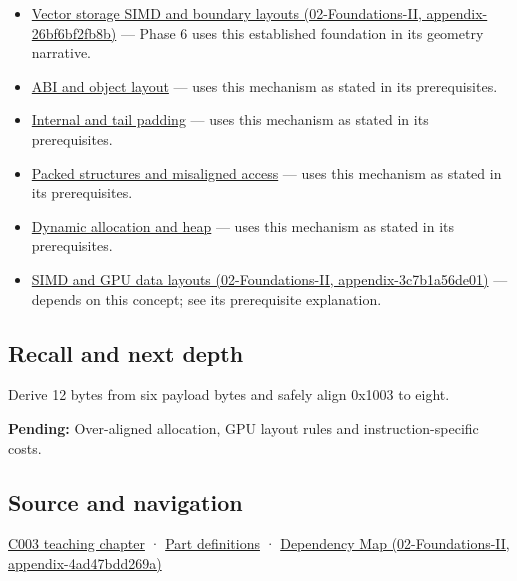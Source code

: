 \begin{itemize}
\item
  \href{../02-Foundations-II/main.pdf\#nameddest=appendix-26bf6bf2fb8b}{Vector storage SIMD and boundary layouts (02-Foundations-II, appendix-26bf6bf2fb8b)} --- Phase 6 uses this established foundation in its geometry narrative.
\item
  \hyperref[appendix-c4ac6bb0fff8]{ABI and object layout} --- uses this mechanism as stated in its prerequisites.
\item
  \hyperref[appendix-f52f8c5a3afd]{Internal and tail padding} --- uses this mechanism as stated in its prerequisites.
\item
  \hyperref[appendix-0682dbfc5f0e]{Packed structures and misaligned access} --- uses this mechanism as stated in its prerequisites.
\item
  \hyperref[appendix-c3480f7d9ff3]{Dynamic allocation and heap} --- uses this mechanism as stated in its prerequisites.
\item
  \href{../02-Foundations-II/main.pdf\#nameddest=appendix-3c7b1a56de01}{SIMD and GPU data layouts (02-Foundations-II, appendix-3c7b1a56de01)} --- depends on this concept; see its prerequisite explanation.
\end{itemize}

\subsection{Recall and next depth}\label{appendix-a1f7c53b4742-recall-and-next-depth}

Derive 12 bytes from six payload bytes and safely align 0x1003 to eight.

\textbf{Pending:} Over-aligned allocation, GPU layout rules and instruction-specific costs.

\subsection{Source and navigation}\label{appendix-a1f7c53b4742-source-and-navigation}

\hyperref[01-foundations-i-ch002-where-the-bytes-live]{C003 teaching chapter} · \hyperref[appendix-fd090d982a15-m003---parts-41-60]{Part definitions} · \href{../02-Foundations-II/main.pdf\#nameddest=appendix-4ad47bdd269a}{Dependency Map (02-Foundations-II, appendix-4ad47bdd269a)}
